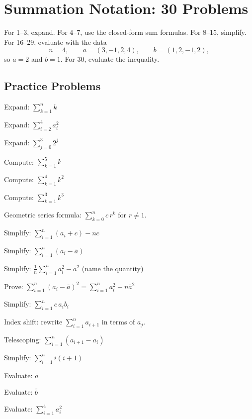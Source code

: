 \chapter{Summation Notation: 30 Problems}

For 1--3, expand. For 4--7, use the closed-form sum formulas. For 8--15,
simplify. For 16--29, evaluate with the data
\[
  n=4,\qquad a=(3,-1,2,4),\qquad b=(1,2,-1,2),
\]
so $\bar a=2$ and $\bar b=1$. For 30, evaluate the inequality.

\section{Practice Problems}

\begin{problems}
  \item Expand: $\displaystyle\sum_{k=1}^{n}k$
  \item Expand: $\displaystyle\sum_{i=2}^{4}a_{i}^{2}$
  \item Expand: $\displaystyle\sum_{j=0}^{3}2^{j}$
  \item Compute: $\displaystyle\sum_{k=1}^{5}k$
  \item Compute: $\displaystyle\sum_{k=1}^{4}k^{2}$
  \item Compute: $\displaystyle\sum_{k=1}^{3}k^{3}$
  \item Geometric series formula: $\displaystyle\sum_{k=0}^{n}c\,r^{k}$ for
        $r\neq 1$.
  \item Simplify: $\displaystyle\sum_{i=1}^{n}(a_{i}+c)-nc$
  \item Simplify: $\displaystyle\sum_{i=1}^{n}(a_{i}-\bar a)$
  \item Simplify: $\displaystyle\frac{1}{n}\sum_{i=1}^{n}a_{i}^{2}-\bar
        a^{2}$ (name the quantity)
  \item Prove: $\displaystyle\sum_{i=1}^{n}(a_{i}-\bar a)^{2}
        =\sum_{i=1}^{n}a_{i}^{2}-n\bar a^{2}$
  \item Simplify: $\displaystyle\sum_{i=1}^{n}c\,a_{i}b_{i}$
  \item Index shift: rewrite $\displaystyle\sum_{i=1}^{n}a_{i+1}$ in terms
        of $a_{j}$.
  \item Telescoping: $\displaystyle\sum_{i=1}^{n}(a_{i+1}-a_{i})$
  \item Simplify: $\displaystyle\sum_{i=1}^{n}i(i+1)$
  \item Evaluate: $\bar a$
  \item Evaluate: $\bar b$
  \item Evaluate: $\displaystyle\sum_{i=1}^{4}a_{i}^{2}$

\end{problems}

